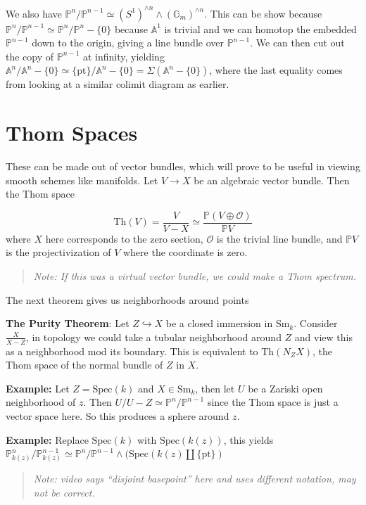 \documentclass[11pt]{scrreprt}
\theoremstyle{definition}
\newcommand{\PP}[0]{{\mathbb{P}}}
\newcommand{\Af}[0]{{\mathbb{A}}}
\newcommand{\spec}[0]{{\mathrm{Spec}}}
\newcommand{\theset}[1]{\{{#1}\}}
\newcommand{\pt}[0]{\{\text{pt}\}}
\newcommand{\Sm}[0]{{\text{Sm}_k}}
\newcommand{\GG}[0]{{\mathbb{G}}}
\newcommand{\homotopic}[0]{\simeq}
\newcommand{\injects}[0]{\hookrightarrow}
\begin{document}
We also have
\(\PP^{n} / \PP^{n-1} \homotopic (S^1)^{\wedge n}\wedge (\GG_m)^{\wedge n}\).
This can be show because
\(\PP^{n} / \PP^{n-1} \homotopic \PP^n / \PP^n-\theset{0}\) because
\(\Af^1\) is trivial and we can homotop the embedded \(\PP^{n-1}\) down
to the origin, giving a line bundle over \(\PP^{n-1}\). We can then cut
out the copy of \(\PP^{n-1}\) at infinity, yielding
\(\Af^n / \Af^{n} - \theset{0} \homotopic \pt / \Af^{n} - \theset{0} = \Sigma (\Af^{n} - \theset{0})\),
where the last equality comes from looking at a similar colimit diagram
as earlier.

\hypertarget{thom-spaces}{%
\section{Thom Spaces}\label{thom-spaces}}

These can be made out of vector bundles, which will prove to be useful
in viewing smooth schemes like manifolds. Let \(V \to X\) be an
algebraic vector bundle. Then the Thom space

\[
\text{Th}(V) = \frac{V} {V-X} \homotopic \frac{\PP(V \oplus \mathcal O)}{\PP V}
\] where \(X\) here corresponds to the zero section, \(\mathcal O\) is
the trivial line bundle, and \(\PP V\) is the projectivization of \(V\)
where the coordinate is zero.

\begin{quote}\textit{
Note: If this was a virtual vector bundle, we could make a Thom
spectrum.
}\end{quote}

The next theorem gives us neighborhoods around points

\textbf{The Purity Theorem}: Let \(Z \injects X\) be a closed immersion
in \(\Sm\). Consider \(\frac X {X-Z}\), in topology we could take a
tubular neighborhood around \(Z\) and view this as a neighborhood mod
its boundary. This is equivalent to \(\text{Th}(N_Z X)\), the Thom space
of the normal bundle of \(Z\) in \(X\).

\textbf{Example:} Let \(Z =\spec(k)\) and \(X \in \Sm\), then let \(U\)
be a Zariski open neighborhood of \(z\). Then
\(U/U-Z \homotopic \PP^n / \PP^{n-1}\) since the Thom space is just a
vector space here. So this produces a sphere around \(z\).

\textbf{Example:} Replace \(\spec(k)\) with \(\spec(k(z))\), this yields
\(\PP^n_{k(z)} / \PP^{n-1}_{k(z)} \homotopic \PP^n / \PP^{n-1} \wedge (\spec (k(z)\coprod \pt)\)
\begin{quote}\textit{
Note: video says ``disjoint basepoint'' here and uses
different notation, may not be correct.
}\end{quote}
\end{document}
